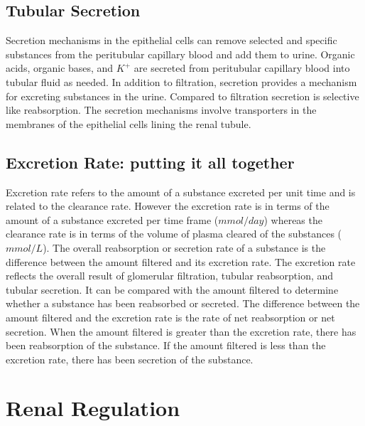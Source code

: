\subsection{Tubular Secretion}

Secretion mechanisms in the epithelial cells can remove selected and specific substances from the peritubular capillary blood and add them to urine. Organic acids, organic bases, and $K^+$ are secreted from peritubular capillary blood into tubular fluid as needed. In addition to filtration, secretion provides a mechanism for excreting substances in the urine. Compared to filtration secretion is selective like reabsorption. The secretion mechanisms involve transporters in the membranes of the epithelial cells lining the renal tubule.

\subsection{Excretion Rate: putting it all together}

Excretion rate refers to the amount of a substance excreted per unit time and is related to the clearance rate. However the excretion rate is in terms of the amount of a substance excreted per time frame ($mmol/day$) whereas the clearance rate is in terms of the volume of plasma cleared of the substances ($mmol/L$). The overall reabsorption or secretion rate of a substance is the difference between the amount filtered and its excretion rate. 
The excretion rate reflects the overall result of glomerular filtration, tubular reabsorption, and tubular secretion. It can be compared with the amount filtered to determine whether a substance has been reabsorbed or secreted. The difference between the amount filtered and the excretion rate is the rate of net reabsorption or net secretion. When the amount filtered is greater than the excretion rate, there has been reabsorption of the substance. If the amount filtered is less than the excretion rate, there has been secretion of the substance.

\section{Renal Regulation}

